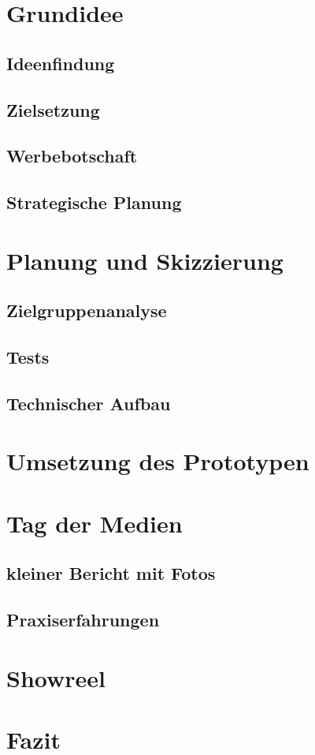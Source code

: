







\tableofcontents


\clearpage
\section{Grundidee}
\subsection{Ideenfindung}
\subsection{Zielsetzung}
\subsection{Werbebotschaft}
\subsection{Strategische Planung}

\clearpage
\section{Planung und Skizzierung}
\subsection{Zielgruppenanalyse}
\subsection{Tests}
\subsection{Technischer Aufbau}

\clearpage
\section{Umsetzung des Prototypen}










\clearpage
\section{Tag der Medien}
\subsection{kleiner Bericht mit Fotos}
\subsection{Praxiserfahrungen}

\clearpage
\section{Showreel}

\clearpage
\section{Fazit}


